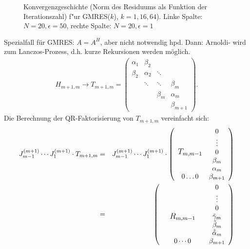 \begin{figure}
\caption{Konvergenzgeschichte (Norm des Residuums als Funktion der 
Iterationszahl) f"ur GMRES($k$), $k=1,16,64$). Linke Spalte:
$N=20, \epsilon = 50$, rechte Spalte: $N=20, \epsilon = 1$}
\end{figure}


Spezialfall f\"ur GMRES: $A=A^H$, aber nicht notwendig hpd. 
Dann: Arnoldi- wird zum Lanczos-Prozess, d.h. kurze Rekursionen werden m\"oglich.
\begin{eqnarray*}
 H_{m+1,m} \rightarrow T_{m+1,m}=
 \left(\begin{array}{cccc}
                        \alpha_1  & \beta_2  & & \\
                        \beta_2   & \alpha_2 & \ddots  & \\
                                  & \ddots   & \ddots  & \beta_m \\
                                  &          & \beta_m & \alpha_{m} \\
					    &          &         & \beta_{m+1}
               \end{array}\right). 
\end{eqnarray*}
Die Berechnung der QR-Faktorisierung von $T_{m+1,m}$ vereinfacht sich:
\begin{eqnarray*}
 J_{m-1}^{(m+1)}\cdots J_{1}^{(m+1)} \cdot T_{m+1,m} & = &
 J_{m-1}^{(m+1)}\cdots J_{1}^{(m+1)} \cdot
               \left(\begin{array}{cc}
                        & 0\\
                        & \vdots\\
				& 0 \\
                        \raisebox{12pt}[-12pt]{\large $T_{m,m-1}$} & \beta_m \\
				& \alpha_m \\
				0 \ldots 0 & \beta_{m+1}
               \end{array}\right) \\
& = & \left(\begin{array}{cc}
                        & 0\\
                        & \vdots\\
				& 0 \\
				& \tilde \gamma_m \\
\quad                        \raisebox{12pt}[-12pt]{\large $R_{m,m-1}$} \quad& \tilde \beta_m \\
				& \tilde {\tilde \alpha}_m \\
				0 \cdots 0 & \beta_{m+1}
               \end{array}\right) 
\end{eqnarray*}
